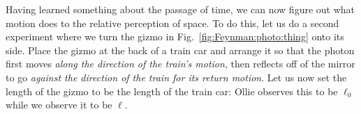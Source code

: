 \begin{subappendices}
Having learned something about the passage of time, we can now figure out what motion does to the relative perception of space. To do this, let us do a second experiment where we turn the gizmo in Fig.~\ref{fig:Feynman:photo:thing} onto its side. Place the gizmo at the back of a train car and arrange it so that the photon first moves \emph{along the direction of the train's motion}, then reflects off of the mirror to go \emph{against the direction of the train for its return motion}. Let us now set the length of the gizmo to be the length of the train car: Ollie observes this to be $\ell_0$ while we observe it to be $\ell$. 


\end{subappendices}
